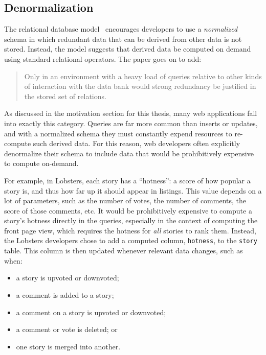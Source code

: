 \subsection{Denormalization}

The relational database model~\cite{relational} encourages developers to use
a \emph{normalized} schema in which redundant data that can be derived from
other data is not stored. Instead, the model suggests that derived data be
computed on demand using standard relational operators. The paper goes on to
add:

\begin{quote}
Only in an environment with a heavy load of queries relative to other kinds
of interaction with the data bank would strong redundancy be justified in the
stored set of relations.
\end{quote}

As discussed in the motivation section for this thesis, many web applications
fall into exactly this category. Queries are far more common than inserts or
updates, and with a normalized schema they must constantly expend resources to
re-compute such derived data. For this reason, web developers often explicitly
denormalize their schema to include data that would be prohibitively expensive
to compute on-demand.

For example, in Lobsters, each story has a ``hotness'': a score of how popular a
story is, and thus how far up it should appear in listings. This value depends
on a lot of parameters, such as the number of votes, the number of comments, the
score of those comments, etc. It would be prohibitively expensive to compute a
story's hotness directly in the queries, especially in the context of computing
the front page view, which requires the hotness for \emph{all} stories to rank
them. Instead, the Lobsters developers chose to add a computed column,
\texttt{hotness}, to the \texttt{story} table. This column is then updated
whenever relevant data changes, such as when:

\begin{itemize}
    \item a story is upvoted or downvoted;
    \item a comment is added to a story;
    \item a comment on a story is upvoted or downvoted;
    \item a comment or vote is deleted; or
    \item one story is merged into another.
\end{itemize}

